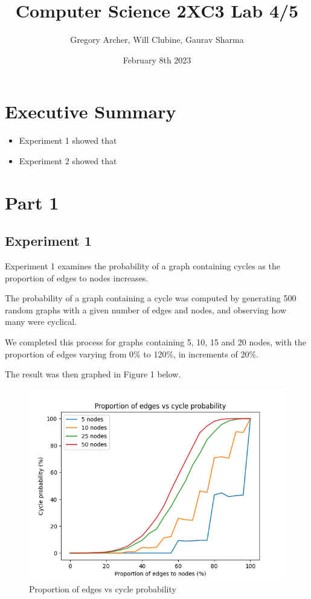 \documentclass[titlepage]{article}
\title{Computer Science 2XC3 Lab 4/5}
\author{Gregory Archer, Will Clubine, Gaurav Sharma}
\date{February 8th 2023}
\begin{document}
\maketitle
\tableofcontents
\listoffigures

\newpage

\section{Executive Summary}
\begin{itemize}
    \item Experiment 1 showed that
    \item Experiment 2 showed that
\end{itemize}

\section{Part 1}

\subsection{Experiment 1}

Experiment 1 examines the probability of a graph containing cycles as the proportion of edges to nodes increases.

The probability of a graph containing a cycle was computed by generating 500 random graphs with a given number of edges and nodes, and observing how many were cyclical.

We completed this process for graphs containing 5, 10, 15 and 20 nodes, with the proportion of edges varying from 0\% to 120\%, in increments of 20\%.

The result was then graphed in Figure 1 below.

\begin{figure}[H]
    \centering
    \includegraphics[width=0.8\linewidth]{experiment_1.png}
    \caption{Proportion of edges vs cycle probability}
    \label{fig:edges_vs_cycle}
\end{figure}
\end{document}
